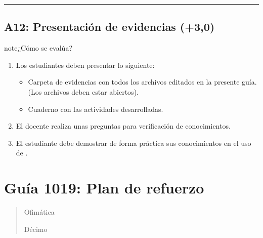 \documentclass[letterpaper,10pt,spanish]{sphinxmanual}
\begin{document}
\bigskip\hrule\bigskip



\subsection{A12: Presentación de evidencias (+3,0)}
\label{\detokenize{1_guias/10ofimatica/G1014:a12-presentacion-de-evidencias-3-0}}
\sphinxAtStartPar
{}

\begin{sphinxadmonition}{note}{¿Cómo se evalúa?}
\begin{enumerate}
%
\item {} 
\sphinxAtStartPar
Los estudiantes deben presentar lo siguiente:
\begin{itemize}
\item {} 
\sphinxAtStartPar
Carpeta de evidencias con todos los archivos editados en la presente guía. (Los archivos deben estar abiertos).

\item {} 
\sphinxAtStartPar
Cuaderno con las actividades desarrolladas.

\end{itemize}

\item {} 
\sphinxAtStartPar
El docente realiza unas preguntas para verificación de conocimientos.

\item {} 
\sphinxAtStartPar
El estudiante debe demostrar de forma práctica sus conocimientos en el uso de .

\end{enumerate}
\end{sphinxadmonition}

\sphinxstepscope


\section{Guía 1019: Plan de refuerzo}
\label{\detokenize{1_guias/10ofimatica/G1019:guia-1019-plan-de-refuerzo}}\label{\detokenize{1_guias/10ofimatica/G1019::doc}}\begin{quote}\begin{description}
\sphinxAtStartPar
Ofimática

\sphinxAtStartPar
Décimo

\end{description}\end{quote}
\end{document}
